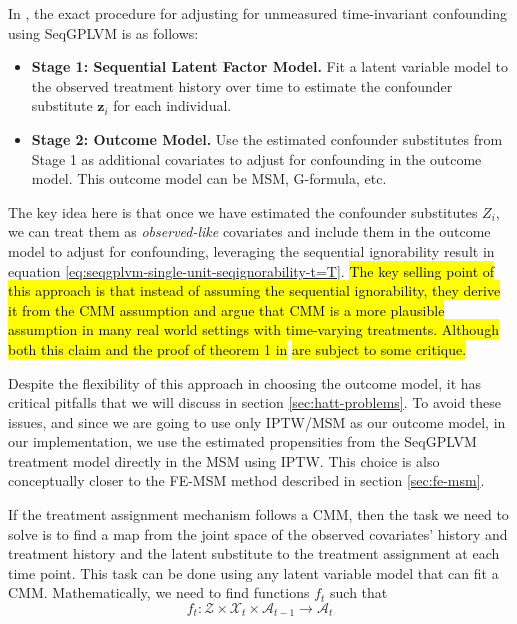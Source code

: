 In \cite{hattSequentialDeconfoundingCausal2024}, the exact procedure for adjusting for unmeasured time-invariant confounding using SeqGPLVM is as follows:
\begin{itemize}
    \item \textbf{Stage 1: Sequential Latent Factor Model.} Fit a latent variable model to the 
    observed treatment history over time to estimate the confounder substitute $\mathbf{z}_i$ for each individual.
    \item \textbf{Stage 2: Outcome Model.} Use the estimated confounder substitutes from Stage 1 as additional covariates to adjust for confounding in the outcome model. This outcome model can be MSM, G-formula, etc.
\end{itemize}
The key idea here is that once we have estimated the confounder substitutes $Z_i$, we can 
treat them as \emph{observed-like} covariates and include them in the outcome model to adjust for 
confounding, leveraging the sequential ignorability result in equation 
\ref{eq:seqgplvm-single-unit-seqignorability-t=T}. \hl{The key selling point of this approach is 
that instead of assuming the sequential ignorability, they derive it from the CMM assumption 
and argue that CMM is a more plausible assumption in many real world settings with time-varying treatments. Although 
both this claim and the proof of theorem 1 in} \cite{hattSequentialDeconfoundingCausal2024} \hl{are subject to some critique.}

Despite the flexibility of this approach in choosing 
the outcome model, it has critical pitfalls that we will discuss in section \ref{sec:hatt-problems}. 
To avoid these issues, and since we are going to use only IPTW/MSM as our outcome model,  
in our implementation, we use the estimated propensities from the
SeqGPLVM treatment model directly in the MSM using IPTW. This choice is also conceptually closer to 
the FE-MSM method described in section \ref{sec:fe-msm}. 

If the treatment assignment mechanism follows a CMM, then the task we need to solve is to find a 
map from the joint space of the observed covariates' history and treatment history and the latent 
substitute to the 
treatment assignment at each time point. This task can be done using any latent variable model that can fit a CMM. Mathematically, we need to find functions \(f_t\) such that 
\[
f_t \colon \mathcal{Z} \times \mathcal{X}_t \times \mathcal{A}_{t-1} \rightarrow \mathcal{A}_t
\]

